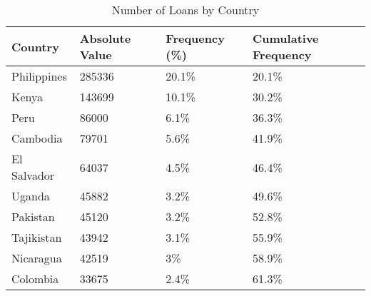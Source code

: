 \begin{table}[!htb]
\centering
\begin{tabular}{llll}
  \hline
Country & Absolute Value & Frequency (\%) & Cumulative Frequency \\ 
  \hline
Philippines & 285336 & 20.1\% & 20.1\% \\ 
  Kenya & 143699 & 10.1\% & 30.2\% \\ 
  Peru & 86000 & 6.1\% & 36.3\% \\ 
  Cambodia & 79701 & 5.6\% & 41.9\% \\ 
  El Salvador & 64037 & 4.5\% & 46.4\% \\ 
  Uganda & 45882 & 3.2\% & 49.6\% \\ 
  Pakistan & 45120 & 3.2\% & 52.8\% \\ 
  Tajikistan & 43942 & 3.1\% & 55.9\% \\ 
  Nicaragua & 42519 & 3\% & 58.9\% \\ 
  Colombia & 33675 & 2.4\% & 61.3\% \\ 
   \hline
\end{tabular}
\caption{Number of Loans by Country} 
\label{tab:Loan_Country}
\end{table}
